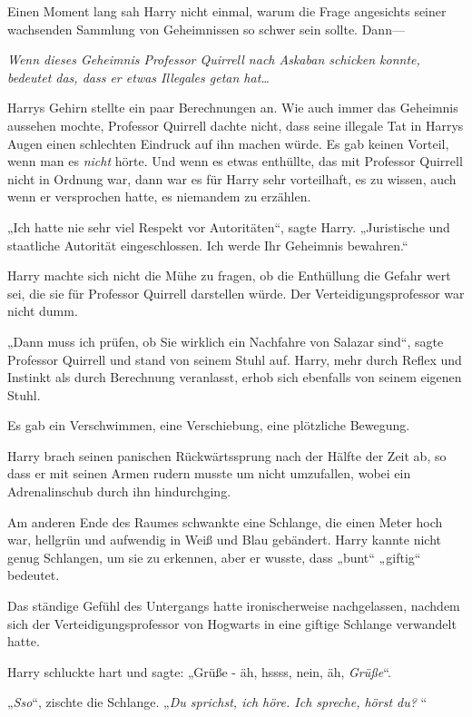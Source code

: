 {Einen Moment lang sah Harry nicht einmal, warum die Frage angesichts seiner wachsenden Sammlung von Geheimnissen so schwer sein sollte. Dann—

\emph{Wenn dieses Geheimnis Professor Quirrell nach Askaban schicken konnte, bedeutet das, dass er etwas Illegales getan hat…}

Harrys Gehirn stellte ein paar Berechnungen an. Wie auch immer das Geheimnis aussehen mochte, Professor Quirrell dachte nicht, dass seine illegale Tat in Harrys Augen einen schlechten Eindruck auf ihn machen würde. Es gab keinen Vorteil, wenn man es \emph{nicht} hörte. Und wenn es etwas enthüllte, das mit Professor Quirrell nicht in Ordnung war, dann war es für Harry sehr vorteilhaft, es zu wissen, auch wenn er versprochen hatte, es niemandem zu erzählen.

„Ich hatte nie sehr viel Respekt vor Autoritäten“, sagte Harry. „Juristische und staatliche Autorität eingeschlossen. Ich werde Ihr Geheimnis bewahren.“

Harry machte sich nicht die Mühe zu fragen, ob die Enthüllung die Gefahr wert sei, die sie für Professor Quirrell darstellen würde. Der Verteidigungsprofessor war nicht dumm.

„Dann muss ich prüfen, ob Sie wirklich ein Nachfahre von Salazar sind“, sagte Professor Quirrell und stand von seinem Stuhl auf. Harry, mehr durch Reflex und Instinkt als durch Berechnung veranlasst, erhob sich ebenfalls von seinem eigenen Stuhl.

Es gab ein Verschwimmen, eine Verschiebung, eine plötzliche Bewegung.

Harry brach seinen panischen Rückwärtssprung nach der Hälfte der Zeit ab, so dass er mit seinen Armen rudern musste um nicht umzufallen, wobei ein Adrenalinschub durch ihn hindurchging.

Am anderen Ende des Raumes schwankte eine Schlange, die einen Meter hoch war, hellgrün und aufwendig in Weiß und Blau gebändert. Harry kannte nicht genug Schlangen, um sie zu erkennen, aber er wusste, dass „bunt“ „giftig“ bedeutet.

Das ständige Gefühl des Untergangs hatte ironischerweise nachgelassen, nachdem sich der Verteidigungsprofessor von Hogwarts in eine giftige Schlange verwandelt hatte.

Harry schluckte hart und sagte: „Grüße - äh, hssss, nein, äh, \emph{Grüße}“.

„\emph{Sso}“, zischte die Schlange. „\emph{Du sprichst, ich höre. Ich spreche, hörst du?} “

}
